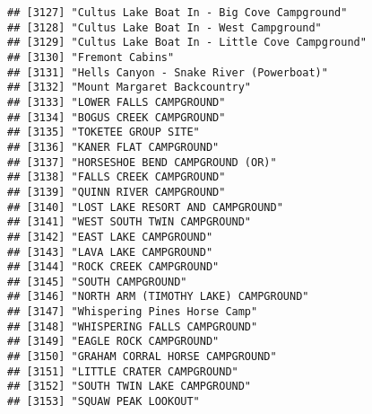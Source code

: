 \documentclass[
]{article}
\begin{document}
\begin{verbatim}
## [3127] "Cultus Lake Boat In - Big Cove Campground"                                           
## [3128] "Cultus Lake Boat In - West Campground"                                               
## [3129] "Cultus Lake Boat In - Little Cove Campground"                                        
## [3130] "Fremont Cabins"                                                                      
## [3131] "Hells Canyon - Snake River (Powerboat)"                                              
## [3132] "Mount Margaret Backcountry"                                                          
## [3133] "LOWER FALLS CAMPGROUND"                                                              
## [3134] "BOGUS CREEK CAMPGROUND"                                                              
## [3135] "TOKETEE GROUP SITE"                                                                  
## [3136] "KANER FLAT CAMPGROUND"                                                               
## [3137] "HORSESHOE BEND CAMPGROUND (OR)"                                                      
## [3138] "FALLS CREEK CAMPGROUND"                                                              
## [3139] "QUINN RIVER CAMPGROUND"                                                              
## [3140] "LOST LAKE RESORT AND CAMPGROUND"                                                     
## [3141] "WEST SOUTH TWIN CAMPGROUND"                                                          
## [3142] "EAST LAKE CAMPGROUND"                                                                
## [3143] "LAVA LAKE CAMPGROUND"                                                                
## [3144] "ROCK CREEK CAMPGROUND"                                                               
## [3145] "SOUTH CAMPGROUND"                                                                    
## [3146] "NORTH ARM (TIMOTHY LAKE) CAMPGROUND"                                                 
## [3147] "Whispering Pines Horse Camp"                                                         
## [3148] "WHISPERING FALLS CAMPGROUND"                                                         
## [3149] "EAGLE ROCK CAMPGROUND"                                                               
## [3150] "GRAHAM CORRAL HORSE CAMPGROUND"                                                      
## [3151] "LITTLE CRATER CAMPGROUND"                                                            
## [3152] "SOUTH TWIN LAKE CAMPGROUND"                                                          
## [3153] "SQUAW PEAK LOOKOUT"                                                                  

\end{verbatim}
\end{document}

